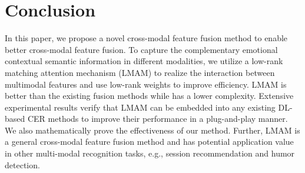 {{\begin{table}[htbp]
	\renewcommand\arraystretch{1.2}
\end{table}

\section{Conclusion}
In this paper, we propose a novel cross-modal feature fusion method to enable better cross-modal feature fusion. {To capture the complementary emotional contextual semantic information in different modalities,} we utilize a low-rank matching attention mechanism (LMAM) to realize the interaction between multimodal features and use low-rank weights to improve efficiency. LMAM is better than the existing fusion methods while has a lower complexity. Extensive experimental results verify that LMAM can be embedded into any existing DL-based CER methods to improve their performance in a plug-and-play manner. We also mathematically prove the effectiveness of our method. Further, LMAM is a general cross-modal feature fusion method and has potential application value in other multi-modal {recognition} tasks, e.g., session recommendation and humor detection.

}}
